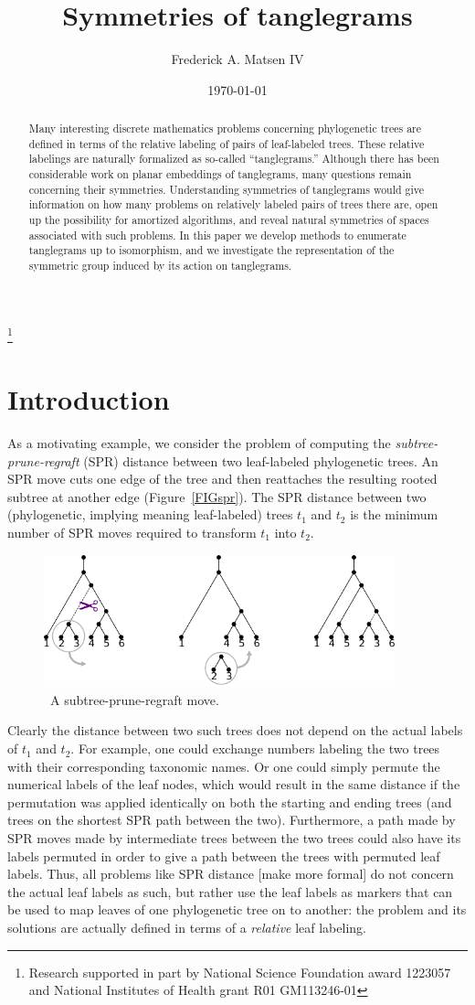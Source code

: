 \documentclass{amsart}
\newcommand{\arxiv}[1]{#1}
\newcommand{\FIGspr}{\
\label{FIGspr}
\begin{figure}
  \arxiv{\includegraphics[width=4in]{figures/spr-definition}}
\caption{\
  A subtree-prune-regraft move.
}
\end{figure}
}
\begin{document}
\title{Symmetries of tanglegrams}
\author[Matsen]{Frederick A. Matsen IV}
\address{Fred Hutchinson Cancer Research Center \\ Seattle, WA}
\thanks{Research supported in part by National Science Foundation award 1223057 and National Institutes of Health grant R01 GM113246-01}


\date{\today}

\begin{abstract}
Many interesting discrete mathematics problems concerning phylogenetic trees are defined in terms of the relative labeling of pairs of leaf-labeled trees.
These relative labelings are naturally formalized as so-called ``tanglegrams.''
Although there has been considerable work on planar embeddings of tanglegrams, many questions remain concerning their symmetries.
Understanding symmetries of tanglegrams would give information on how many problems on relatively labeled pairs of trees there are, open up the possibility for amortized algorithms, and reveal natural symmetries of spaces associated with such problems.
In this paper we develop methods to enumerate tanglegrams up to isomorphism, and we investigate the representation of the symmetric group induced by its action on tanglegrams.
\end{abstract}

\maketitle


\section{Introduction}
As a motivating example, we consider the problem of computing the \emph{subtree-prune-regraft} (SPR) distance between two leaf-labeled phylogenetic trees.
An SPR move cuts one edge of the tree and then reattaches the resulting rooted subtree at another edge (Figure~\ref{FIGspr}).
The SPR distance between two (phylogenetic, implying meaning leaf-labeled) trees $t_1$ and $t_2$ is the minimum number of SPR moves required to transform $t_1$ into $t_2$.
\FIGspr

Clearly the distance between two such trees does not depend on the actual labels of $t_1$ and $t_2$.
For example, one could exchange numbers labeling the two trees with their corresponding taxonomic names.
Or one could simply permute the numerical labels of the leaf nodes, which would result in the same distance if the permutation was applied identically on both the starting and ending trees (and trees on the shortest SPR path between the two).
Furthermore, a path made by SPR moves made by intermediate trees between the two trees could also have its labels permuted in order to give a path between the trees with permuted leaf labels.
Thus, all problems like SPR distance [make more formal] do not concern the actual leaf labels as such, but rather use the leaf labels as markers that can be used to map leaves of one phylogenetic tree on to another: the problem and its solutions are actually defined in terms of a \emph{relative} leaf labeling.
\end{document}

